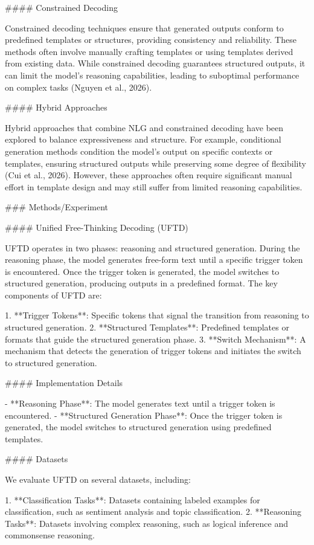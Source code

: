 #### Constrained Decoding

Constrained decoding techniques ensure that generated outputs conform to predefined templates or structures, providing consistency and reliability. These methods often involve manually crafting templates or using templates derived from existing data. While constrained decoding guarantees structured outputs, it can limit the model's reasoning capabilities, leading to suboptimal performance on complex tasks (Nguyen et al., 2026).

#### Hybrid Approaches

Hybrid approaches that combine NLG and constrained decoding have been explored to balance expressiveness and structure. For example, conditional generation methods condition the model’s output on specific contexts or templates, ensuring structured outputs while preserving some degree of flexibility (Cui et al., 2026). However, these approaches often require significant manual effort in template design and may still suffer from limited reasoning capabilities.

### Methods/Experiment

#### Unified Free-Thinking Decoding (UFTD)

UFTD operates in two phases: reasoning and structured generation. During the reasoning phase, the model generates free-form text until a specific trigger token is encountered. Once the trigger token is generated, the model switches to structured generation, producing outputs in a predefined format. The key components of UFTD are:

1. **Trigger Tokens**: Specific tokens that signal the transition from reasoning to structured generation.
2. **Structured Templates**: Predefined templates or formats that guide the structured generation phase.
3. **Switch Mechanism**: A mechanism that detects the generation of trigger tokens and initiates the switch to structured generation.

#### Implementation Details

- **Reasoning Phase**: The model generates text until a trigger token is encountered.
- **Structured Generation Phase**: Once the trigger token is generated, the model switches to structured generation using predefined templates.

#### Datasets

We evaluate UFTD on several datasets, including:

1. **Classification Tasks**: Datasets containing labeled examples for classification, such as sentiment analysis and topic classification.
2. **Reasoning Tasks**: Datasets involving complex reasoning, such as logical inference and commonsense reasoning.

